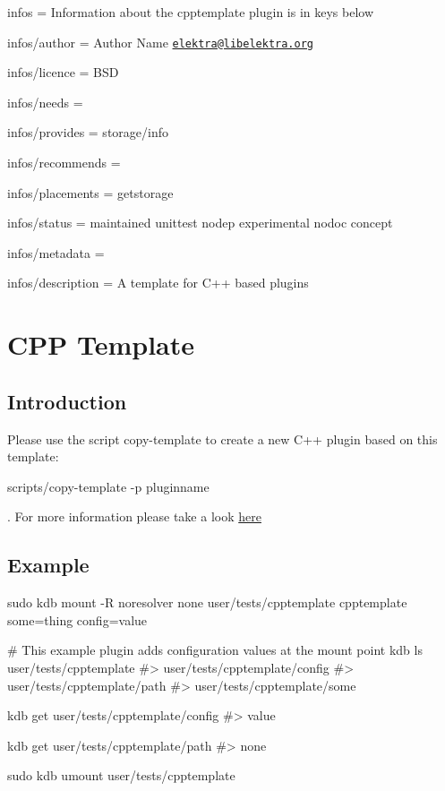 
\begin{DoxyItemize}
\item infos = Information about the cpptemplate plugin is in keys below
\item infos/author = Author Name \href{mailto:elektra@libelektra.org}{\tt elektra@libelektra.\+org}
\item infos/licence = B\+SD
\item infos/needs =
\item infos/provides = storage/info
\item infos/recommends =
\item infos/placements = getstorage
\item infos/status = maintained unittest nodep experimental nodoc concept
\item infos/metadata =
\item infos/description = A template for C++ based plugins
\end{DoxyItemize}\hypertarget{md_src_plugins_cpptemplate_README_src_plugins_cpptemplate_README_md}{}\section{C\+P\+P Template}\label{md_src_plugins_cpptemplate_README_src_plugins_cpptemplate_README_md}
\subsection*{Introduction}

Please use the script copy-\/template to create a new C++ plugin based on this template\+:


\begin{DoxyCode}
scripts/copy-template -p pluginname
\end{DoxyCode}


. For more information please take a look \hyperlink{md_src_plugins_template_README_src_plugins_template_README_md}{here}

\subsection*{Example}


\begin{DoxyCode}
sudo kdb mount -R noresolver none user/tests/cpptemplate cpptemplate some=thing config=value

# This example plugin adds configuration values at the mount point
kdb ls user/tests/cpptemplate
#> user/tests/cpptemplate/config
#> user/tests/cpptemplate/path
#> user/tests/cpptemplate/some

kdb get user/tests/cpptemplate/config
#> value

kdb get user/tests/cpptemplate/path
#> none

sudo kdb umount user/tests/cpptemplate
\end{DoxyCode}
 